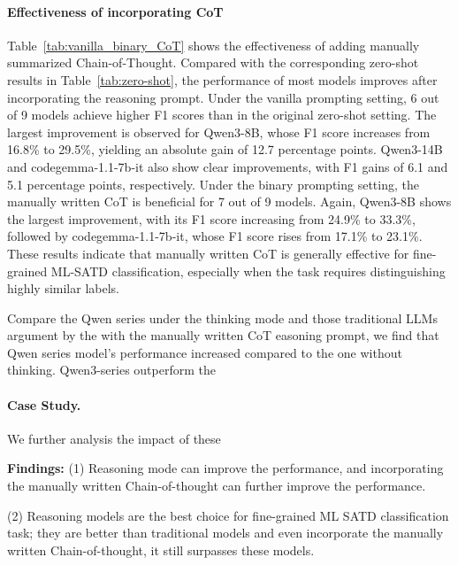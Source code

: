 \documentclass[acmsmall,screen,review,anonymous]{acmart}
\begin{document}
\paragraph{Effectiveness of incorporating CoT}
Table~\ref{tab:vanilla_binary_CoT} shows the effectiveness of adding manually summarized Chain-of-Thought. Compared with the corresponding zero-shot results in Table~\ref{tab:zero-shot}, the performance of most models improves after incorporating the reasoning prompt. Under the vanilla prompting setting, 6 out of 9 models achieve higher F1 scores than in the original zero-shot setting. The largest improvement is observed for Qwen3-8B, whose F1 score increases from 16.8\% to 29.5\%, yielding an absolute gain of 12.7 percentage points. Qwen3-14B and codegemma-1.1-7b-it also show clear improvements, with F1 gains of 6.1 and 5.1 percentage points, respectively. Under the binary prompting setting, the manually written CoT is beneficial for 7 out of 9 models. Again, Qwen3-8B shows the largest improvement, with its F1 score increasing from 24.9\% to 33.3\%, followed by codegemma-1.1-7b-it, whose F1 score rises from 17.1\% to 23.1\%. These results indicate that manually written CoT is generally effective for fine-grained ML-SATD classification, especially when the task requires distinguishing highly similar labels.



Compare the Qwen series under the thinking mode and those traditional LLMs argument by the with the manually written CoT easoning prompt, we find that Qwen series model's performance increased compared to the one without thinking. Qwen3-series outperform the 

\paragraph{Case Study.} We further analysis the impact of these 



\begin{boxB}
\textbf{Findings:} (1) Reasoning mode can improve the performance, and incorporating the manually written Chain-of-thought can further improve the performance. 

(2) Reasoning models are the best choice for fine-grained ML SATD classification task; they are better than traditional models and even incorporate the manually written Chain-of-thought, it still surpasses these models.


\end{boxB}
\end{document}
